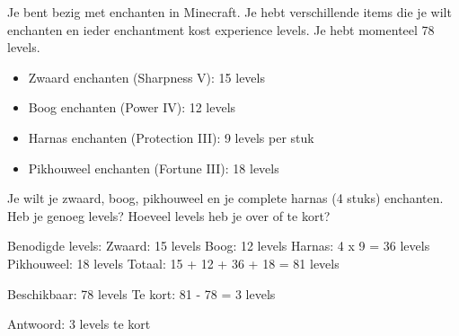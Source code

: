 \begin{opgave}
Je bent bezig met enchanten in Minecraft. Je hebt verschillende items die je wilt enchanten
en ieder enchantment kost experience levels. Je hebt momenteel 78 levels.

\begin{itemize}
\item Zwaard enchanten (Sharpness V): 15 levels
\item Boog enchanten (Power IV): 12 levels  
\item Harnas enchanten (Protection III): 9 levels per stuk
\item Pikhouweel enchanten (Fortune III): 18 levels
\end{itemize}

Je wilt je zwaard, boog, pikhouweel en je complete harnas (4 stuks) enchanten.
Heb je genoeg levels? Hoeveel levels heb je over of te kort?
\end{opgave}

\begin{oplossing}
Benodigde levels:
Zwaard: 15 levels
Boog: 12 levels
Harnas: 4 x 9 = 36 levels
Pikhouweel: 18 levels
Totaal: 15 + 12 + 36 + 18 = 81 levels

Beschikbaar: 78 levels
Te kort: 81 - 78 = 3 levels

Antwoord: 3 levels te kort
\end{oplossing}